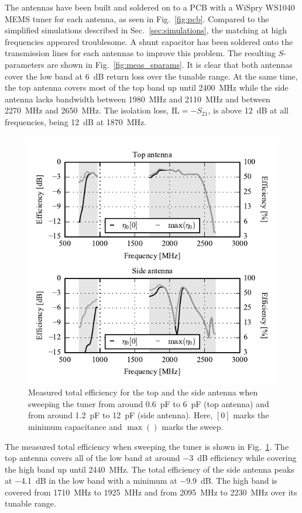 The antennas have been built and soldered on to a PCB with a WiSpry WS1040 MEMS tuner for each antenna, as seen in Fig.~\ref{fig:pcb}. Compared to the simplified simulations described in Sec.~\ref{sec:simulations}, the matching at high frequencies appeared troublesome. A shunt capacitor has been soldered onto the transmission lines for each antennas to improve this problem. 
The resulting $S$-parameters are shown in Fig.~\ref{fig:meas_sparams}. It is clear that both antennas cover the low band at \SI{6}{dB} return loss over the tunable range. At the same time, the top antenna covers most of the top band up until \SI{2400}{MHz} while the side antenna lacks bandwidth between \SI{1980}{MHz} and \SI{2110}{MHz} and between \SI{2270}{MHz} and \SI{2650}{MHz}. The isolation loss, $\text{IL}=-S_{21}$, is above \SI{12}{dB} at all frequencies, being \SI{12}{dB} at \SI{1870}{MHz}.

\begin{figure}[tb]
    \centering
    \includegraphics{img/meas/efficiency}
    \caption{Measured total efficiency for the top and the side antenna when sweeping the tuner from around \SI{0.6}{pF} to \SI{6}{pF} (top antenna) and from around \SI{1.2}{pF} to \SI{12}{pF} (side antenna). Here, $[0]$ marks the minimum capacitance and $\max()$ marks the sweep.}
    \label{fig:meas_eff}
\end{figure}

The measured total efficiency when sweeping the tuner is shown in Fig.~\ref{fig:meas_eff}. The top antenna covers all of the low band at around \SI{-3}{dB} efficiency while covering the high band up until \SI{2440}{MHz}. The total efficiency of the side antenna peaks at \SI{-4.1}{dB} in the low band with a minimum at \SI{-9.9}{dB}. The high band is covered from \SI{1710}{MHz} to \SI{1925}{MHz} and from \SI{2095}{MHz} to \SI{2230}{MHz} over its tunable range.


